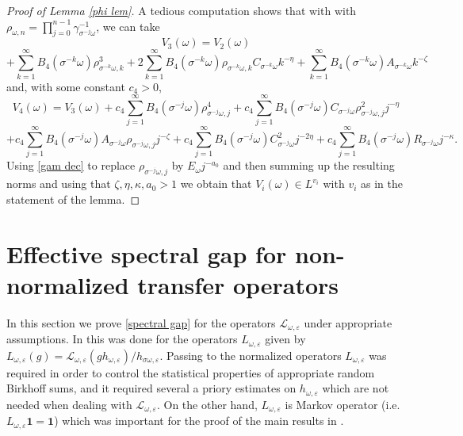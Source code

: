 \documentclass[11pt,reqno,a4paper]{article}
\theoremstyle{special}
\def\om{\omega}
\begin{document}
\begin{proof}[Proof of Lemma \ref{phi lem}]

A tedious computation shows that with 
 with $\rho_{\om,n}=\prod_{j=0}^{n-1}\gamma_{\sigma^{-j}\om}^{-1}$,
 we can take
$$
V_3(\om)=V_2(\om)
$$
$$
+\sum_{k=1}^\infty B_4(\sigma^{-k}\om)\rho_{\sigma^{-k}\om,k}^3+
2\sum_{k=1}^\infty B_4(\sigma^{-k}\om)\rho_{\sigma^{-k}\om,k}C_{\sigma^{-k}\om}k^{-\eta}+
\sum_{k=1}^\infty B_4(\sigma^{-k}\om)A_{\sigma^{-k}\om}k^{-\zeta}
$$
and, with some constant $c_4>0$,
$$
V_4(\om)=V_3(\om)+c_4\sum_{j=1}^\infty B_4(\sigma^{-j}\om)\rho_{\sigma^{-j}\om,j}^4+c_4\sum_{j=1}^\infty B_4(\sigma^{-j}\om)C_{\sigma^{-j}\om}\rho_{\sigma^{-j}\om,j}^2j^{-\eta}
$$
$$
+c_4\sum_{j=1}^\infty B_4(\sigma^{-j}\om)A_{\sigma^{-j}\om}\rho_{\sigma^{-j}\om,j}j^{-\zeta}+c_4\sum_{j=1}^\infty B_4(\sigma^{-j}\om)C_{\sigma^{-j}\om}^2j^{-2\eta}+c_4\sum_{j=1}^\infty B_4(\sigma^{-j}\om)R_{\sigma^{-j}\om}j^{-\kappa}.
$$
Using \eqref{gam dec} to replace $\rho_{\sigma^{-j}\om,j}$ by $E_\om j^{-a_0}$
and then summing up the resulting norms and using that $\zeta,\eta,\kappa,a_0>1$ we obtain that $V_i(\om)\in L^{v_i}$ with $v_i$ as in the statement of the lemma.
\end{proof}

\section{Effective spectral gap for non-normalized transfer operators}\label{App}
In this section we prove \eqref{spectral gap} for the operators $\mathcal L_{\omega,\varepsilon}$ under appropriate assumptions. In \cite{YH 23} this was done for the operators $L_{\omega,\varepsilon}$ given by $L_{\omega,\varepsilon}(g)=\mathcal L_{\omega,\varepsilon}(gh_{\omega,\varepsilon})/h_{\sigma \omega,\varepsilon}$. Passing to the normalized operators $L_{\omega,\varepsilon}$ was required in order to control the statistical properties of appropriate random Birkhoff sums, and it required several a priory estimates on $h_{\omega,\varepsilon}$ which are not needed when dealing with $\mathcal L_{\omega,\varepsilon}$. On the other hand, $L_{\omega,\varepsilon}$ is Markov operator (i.e. $L_{\omega,\varepsilon}\textbf{1}=\textbf{1}$) which was important for the proof of the main results in \cite{YH 23}. 
\end{document}
